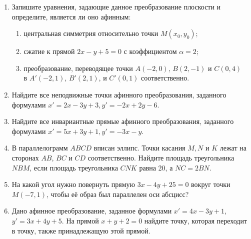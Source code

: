 \begin{enumerate}
    \item Запишите уравнения, задающие данное преобразование плоскости и определите, является ли оно афинным:
        \begin{enumerate}
            \item центральная симметрия относительно точки $M(x_0, y_0)$;
            \item сжатие к прямой $2x - y + 5 = 0$ с коэффициентом $\alpha = 2$;
            \item преобразование, переводящее точки $A(-2, 0)$, $B(2, -1)$ и $C(0, 4)$ \\в $A'(-2, 1)$, $B'(2, 1)$, и $C'(0, 1)$ соответственно.
        \end{enumerate}
   		
   \item  Найдите все неподвижные точки афинного преобразования, заданного формулами ${x' = 2x - 3y +3}, {y' = -2x + 2y - 6}$.
	
	\item Найдите все инвариантные прямые афинного преобразования, заданного формулами ${x' = 5x + 3y +1}, {y' = -3x - y}$.
	
	\item В параллелограмм $ABCD$ вписан эллипс. Точки касания $M, N$ и $K$ лежат на сторонах $AB$, $BC$ и $CD$ соответственно. Найдите площадь треугольника $NBM$, если площадь треугольника $CNK$ равна 20, а $NC = 2BN$.
	
	\item На какой угол нужно повернуть прямую $3x - 4y + 25 = 0$ вокруг точки $M(-7, 1)$, чтобы её образ был параллелен оси абсцисс?
	
	\item Дано афинное преобразование, заданное формулами ${x' = 4x-3y+1}$,  ${y'=3x+4y+5}$. На прямой ${x+y+2=0}$ найдите точку, которая переходит в точку, также принадлежащую этой прямой.
\end{enumerate}